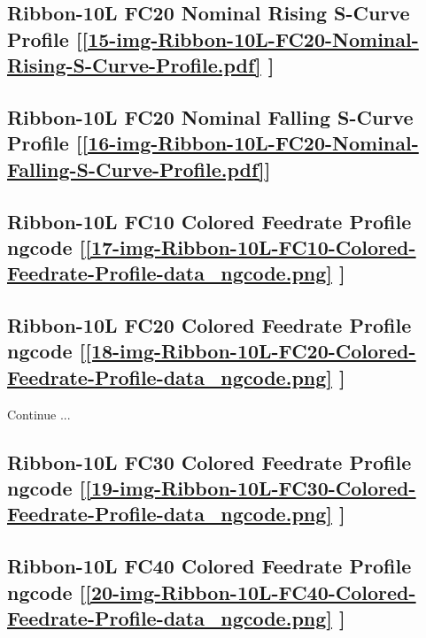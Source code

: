 \subsection     {Ribbon-10L FC20 Nominal Rising S-Curve Profile
	[\ref      {15-img-Ribbon-10L-FC20-Nominal-Rising-S-Curve-Profile.pdf} ] }
\label{ssec-15-img-Ribbon-10L-FC20-Nominal-Rising-S-Curve-Profile.pdf}

\subsection     {Ribbon-10L FC20 Nominal Falling S-Curve Profile
	[\ref      {16-img-Ribbon-10L-FC20-Nominal-Falling-S-Curve-Profile.pdf}] }
\label{ssec-16-img-Ribbon-10L-FC20-Nominal-Falling-S-Curve-Profile.pdf}

\subsection       {Ribbon-10L FC10 Colored Feedrate Profile ngcode
	[\ref      {17-img-Ribbon-10L-FC10-Colored-Feedrate-Profile-data_ngcode.png} ] }
\label{ssec-17-img-Ribbon-10L-FC10-Colored-Feedrate-Profile-data_ngcode.png}

\subsection       {Ribbon-10L FC20 Colored Feedrate Profile ngcode
	[\ref      {18-img-Ribbon-10L-FC20-Colored-Feedrate-Profile-data_ngcode.png} ] }
\label{ssec-18-img-Ribbon-10L-FC20-Colored-Feedrate-Profile-data_ngcode.png}

Continue ...\\

\subsection       {Ribbon-10L FC30 Colored Feedrate Profile ngcode
	[\ref      {19-img-Ribbon-10L-FC30-Colored-Feedrate-Profile-data_ngcode.png} ] }
\label{ssec-19-img-Ribbon-10L-FC30-Colored-Feedrate-Profile-data_ngcode.png}

\subsection       {Ribbon-10L FC40 Colored Feedrate Profile ngcode
	[\ref      {20-img-Ribbon-10L-FC40-Colored-Feedrate-Profile-data_ngcode.png} ] }
\label{ssec-20-img-Ribbon-10L-FC40-Colored-Feedrate-Profile-data_ngcode.png}

